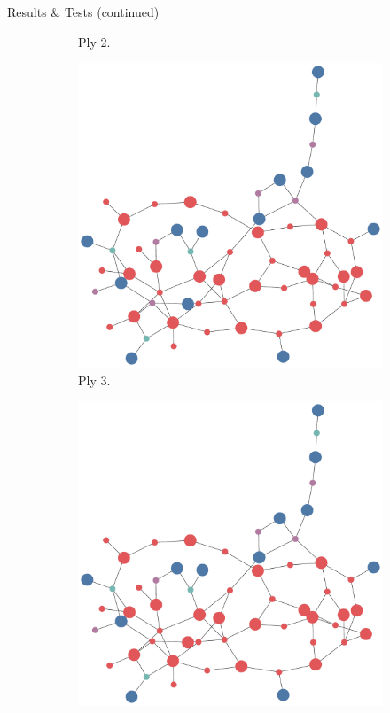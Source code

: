 \documentclass[final]{beamer} %
\begin{document}
\begin{frame}
\begin{columns}
\begin{column}{.35\textwidth}
{\begin{block}{Results \& Tests (continued)}
\begin{figure}[!htb]
\begin{subfigure}[!htb]{0.24\columnwidth}
							\caption{Ply 2.}
						\end{subfigure}
						\begin{subfigure}[!htb]{0.24\columnwidth}
							\centering
							\includegraphics[width=\columnwidth]{figures/knn_backward_think_3.pdf}
							\caption{Ply 3.}
						\end{subfigure}
						\begin{subfigure}[!htb]{0.24\columnwidth}
							\centering
							\includegraphics[width=\columnwidth]{figures/knn_backward_think_4.pdf}

\end{subfigure}
\end{figure}
\end{block}}
\end{column}
\end{columns}
\end{frame}
\end{document}
